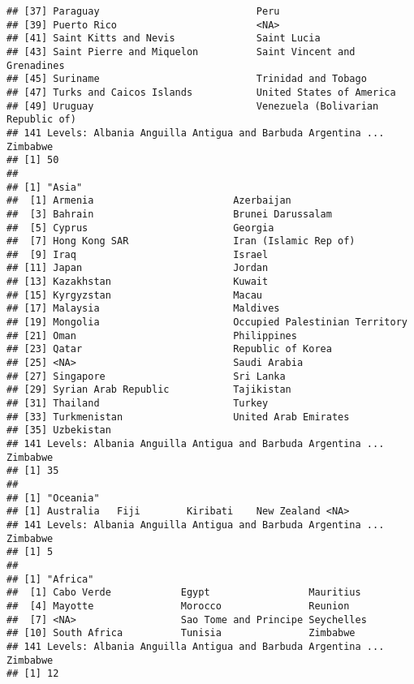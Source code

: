 \documentclass[]{article}
\begin{document}
\begin{verbatim}
## [37] Paraguay                           Peru                              
## [39] Puerto Rico                        <NA>                              
## [41] Saint Kitts and Nevis              Saint Lucia                       
## [43] Saint Pierre and Miquelon          Saint Vincent and Grenadines      
## [45] Suriname                           Trinidad and Tobago               
## [47] Turks and Caicos Islands           United States of America          
## [49] Uruguay                            Venezuela (Bolivarian Republic of)
## 141 Levels: Albania Anguilla Antigua and Barbuda Argentina ... Zimbabwe
## [1] 50
## 
## [1] "Asia"
##  [1] Armenia                        Azerbaijan                    
##  [3] Bahrain                        Brunei Darussalam             
##  [5] Cyprus                         Georgia                       
##  [7] Hong Kong SAR                  Iran (Islamic Rep of)         
##  [9] Iraq                           Israel                        
## [11] Japan                          Jordan                        
## [13] Kazakhstan                     Kuwait                        
## [15] Kyrgyzstan                     Macau                         
## [17] Malaysia                       Maldives                      
## [19] Mongolia                       Occupied Palestinian Territory
## [21] Oman                           Philippines                   
## [23] Qatar                          Republic of Korea             
## [25] <NA>                           Saudi Arabia                  
## [27] Singapore                      Sri Lanka                     
## [29] Syrian Arab Republic           Tajikistan                    
## [31] Thailand                       Turkey                        
## [33] Turkmenistan                   United Arab Emirates          
## [35] Uzbekistan                    
## 141 Levels: Albania Anguilla Antigua and Barbuda Argentina ... Zimbabwe
## [1] 35
## 
## [1] "Oceania"
## [1] Australia   Fiji        Kiribati    New Zealand <NA>       
## 141 Levels: Albania Anguilla Antigua and Barbuda Argentina ... Zimbabwe
## [1] 5
## 
## [1] "Africa"
##  [1] Cabo Verde            Egypt                 Mauritius            
##  [4] Mayotte               Morocco               Reunion              
##  [7] <NA>                  Sao Tome and Principe Seychelles           
## [10] South Africa          Tunisia               Zimbabwe             
## 141 Levels: Albania Anguilla Antigua and Barbuda Argentina ... Zimbabwe
## [1] 12
\end{verbatim}
\end{document}
